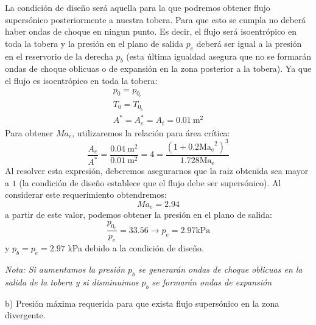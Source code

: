\documentclass[11pt]{report}
\begin{document}
La condici\'on de diseño ser\'a aquella para la que podremos obtener flujo supers\'onico posteriormente a nuestra tobera. Para que esto se cumpla no deber\'a haber ondas de choque en ningun punto. Es decir, el flujo ser\'a isoentr\'opico en toda la tobera y la presi\'on en el plano de salida $p_e$ deber\'a ser igual a la presi\'on en el reservorio de la derecha $p_b$ (esta \'ultima igualdad asegura que no se formar\'an ondas de choque oblicuas o de expansi\'on en la zona posterior a la tobera). Ya que el flujo es isoentr\'opico en toda la tobera:
$$
\begin{array}{l}
p_{0}=p_{0_e} \\
T_{0}=T_{0_{e}} \\
A^{*}=A_{e}^{*}=A_{t}=0.01 \mathrm{~m}^{2}
\end{array}
$$
Para obtener $Ma_e$, utilizaremos la relaci\'on para \'area cr\'itica:
$$
\frac{A_{e}}{A^{*}}=\frac{0.04 \mathrm{~m}^{2}}{0.01 \mathrm{~m}^{2}}=4=\frac{\left(1+0.2 \mathrm{Ma_e}^{2}\right)^{3}}{1.728 \mathrm{Ma}_{\mathrm{e}}}
$$
Al resolver esta expresi\'on, deberemos asegurarnos que la raiz obtenida sea mayor a $1$ (la condici\'on de diseño establece que el flujo debe ser supers\'onico). Al considerar este requerimiento obtendremos:
$$
Ma_{e}=2.94
$$
a partir de este valor, podemos obtener la presi\'on en el plano de salida:
$$
\frac{p_{0_e}}{p_{e}}=33.56 \rightarrow p_{e}=2.97 \text{kPa}
$$
y $p_b=p_e=2.97$ kPa debido a la condici\'on de diseño.

\textit{Nota: Si aumentamos la presi\'on $p_b$ se generar\'an ondas de choque oblicuas en la salida de la tobera y si disminuimos $p_b$ se formar\'an ondas de expansi\'on}

\vspace{0.2cm}

b)  Presión máxima requerida para que exista flujo supersónico en la zona divergente. 
\end{document}
